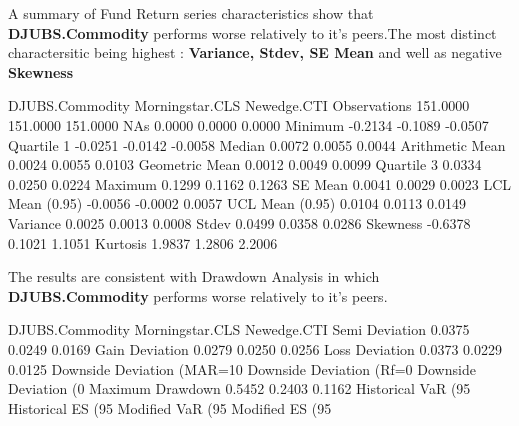 \documentclass[12pt,letterpaper,english]{article}
\begin{document}
A summary of Fund Return series characteristics show that \textbf{DJUBS.Commodity} performs worse relatively to it's peers.The most distinct charactersitic being highest : \textbf{Variance, Stdev, SE Mean} and well as negative \textbf{Skewness} 

\begin{Schunk}
\begin{Soutput}
                DJUBS.Commodity Morningstar.CLS Newedge.CTI
Observations           151.0000        151.0000    151.0000
NAs                      0.0000          0.0000      0.0000
Minimum                 -0.2134         -0.1089     -0.0507
Quartile 1              -0.0251         -0.0142     -0.0058
Median                   0.0072          0.0055      0.0044
Arithmetic Mean          0.0024          0.0055      0.0103
Geometric Mean           0.0012          0.0049      0.0099
Quartile 3               0.0334          0.0250      0.0224
Maximum                  0.1299          0.1162      0.1263
SE Mean                  0.0041          0.0029      0.0023
LCL Mean (0.95)         -0.0056         -0.0002      0.0057
UCL Mean (0.95)          0.0104          0.0113      0.0149
Variance                 0.0025          0.0013      0.0008
Stdev                    0.0499          0.0358      0.0286
Skewness                -0.6378          0.1021      1.1051
Kurtosis                 1.9837          1.2806      2.2006
\end{Soutput}
\end{Schunk}


The results are consistent with Drawdown Analysis in which \textbf{DJUBS.Commodity} performs worse relatively to it's peers.

\begin{Schunk}
\begin{Soutput}
                             DJUBS.Commodity Morningstar.CLS Newedge.CTI
Semi Deviation                        0.0375          0.0249      0.0169
Gain Deviation                        0.0279          0.0250      0.0256
Loss Deviation                        0.0373          0.0229      0.0125
Downside Deviation (MAR=10%
Downside Deviation (Rf=0%
Downside Deviation (0%
Maximum Drawdown                      0.5452          0.2403      0.1162
Historical VaR (95%
Historical ES (95%
Modified VaR (95%
Modified ES (95%
\end{Soutput}
\end{Schunk}
\end{document}
